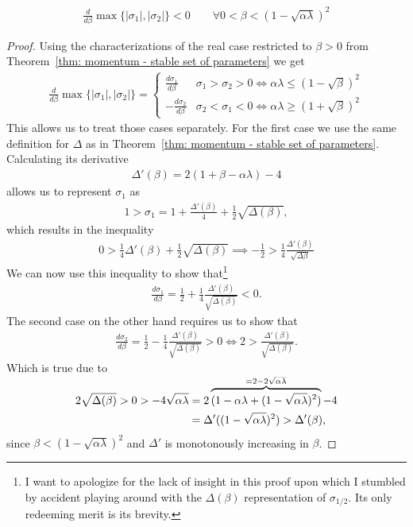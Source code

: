 \begin{lemma}
	\begin{align*}
		\frac{d}{d\beta}\max\{|\sigma_1|,|\sigma_2|\} < 0 \qquad
		\forall 0<\beta <(1-\sqrt{\alpha\lambda})^2
	\end{align*}
\end{lemma}
\begin{proof}
	Using the characterizations of the real case restricted to \(\beta>0\)
	from Theorem~\ref{thm: momentum - stable set of parameters} we get
	\begin{align*}
		\frac{d}{d\beta}\max\{|\sigma_1|,|\sigma_2|\}
		= \begin{cases}
			\frac{d\sigma_1}{d\beta} & \sigma_1 > \sigma_2 > 0 \iff \alpha\lambda\le (1-\sqrt{\beta})^2\\
			-\frac{d\sigma_2}{d\beta} & \sigma_2 < \sigma_1 < 0 \iff \alpha\lambda \ge (1+\sqrt{\beta})^2
		\end{cases}
	\end{align*}
	This allows us to treat those cases separately. For the first case we use
	the same definition for \(\Delta\) as in Theorem~\ref{thm: momentum - stable
	set of parameters}. Calculating its derivative
	\begin{align*}
		\Delta'(\beta) = 2(1+\beta-\alpha\lambda)	-4
	\end{align*}
	allows us to represent \(\sigma_1\) as
	\begin{align*}
		1>\sigma_1
		= 1 + \frac{\Delta'(\beta)}{4} + \tfrac12 \sqrt{\Delta(\beta)},
	\end{align*}
	which results in the inequality
	\begin{align*}
		0 > \tfrac14\Delta'(\beta) + \tfrac12\sqrt{\Delta(\beta)}
		\implies -\tfrac12 > \tfrac14\frac{\Delta'(\beta)}{\sqrt{\Delta{\beta}}}
	\end{align*}
	We can now use this inequality to show that\footnote{
		I want to apologize for the lack of insight in this proof upon which I
		stumbled by accident playing around with the \(\Delta(\beta)\)
		representation of \(\sigma_{1/2}\). Its only redeeming merit is its brevity.
	}
	\begin{align*}
		\frac{d\sigma_1}{d\beta}
		= \frac12 + \frac14 \frac{\Delta'(\beta)}{\sqrt{\Delta(\beta)}} < 0.
	\end{align*}
	The second case on the other hand requires us to show that
	\begin{align*}
		\frac{d\sigma_2}{d\beta}
		= \frac12 - \frac14 \frac{\Delta'(\beta)}{\sqrt{\Delta(\beta)}} > 0
		\iff 2 > \frac{\Delta'(\beta)}{\sqrt{\Delta(\beta)}}.
	\end{align*}
	Which is true due to
	\begin{align*}
		2\sqrt{\Delta(\beta)} > 0 > -4\sqrt{\alpha\lambda}
		&= 2\overbrace{
			(1-\alpha\lambda + (1-\sqrt{\alpha\lambda})^2)
		}^{\smash{=2-2\sqrt{\alpha\lambda}}} -4\\
		&= \Delta'((1-\sqrt{\alpha\lambda})^2) > \Delta'(\beta),
	\end{align*}
	since \(\beta<(1-\sqrt{\alpha\lambda})^2\) and \(\Delta'\) is monotonously
	increasing in \(\beta\).
 \end{proof}



\endinput
